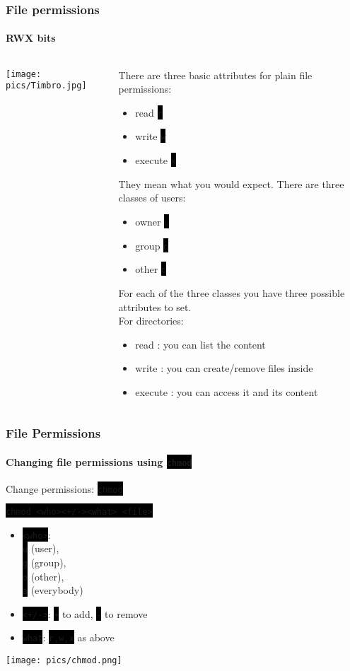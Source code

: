 \documentclass[unknownkeysallowed, 10pt, a4 paper, handout]{beamer}
\newcommand{\code}[1]{\colorbox{black}{\color{green}\texttt{#1}}}
\newcommand{\sidebyside}[5]{
  \begin{minipage}{#1\textwidth}
    #2
  \end{minipage} #3 \begin{minipage}{#4\textwidth}
    #5
  \end{minipage}
}
\begin{document}
\begin{frame}[label=permission]
  \frametitle{File permissions}
  \framesubtitle{RWX bits}
  \begin{columns}[T]
    \begin{column}{.11\textwidth}
      \texttt{[image: pics/Timbro.jpg]}
    \end{column}
    \hfill
    \begin{column}{.89\textwidth}
      \small{
      There are three basic attributes for plain file permissions:
      \begin{itemize}
        \item read \code{r}
        \item write \code{w}
        \item execute \code{x}
      \end{itemize}
      They mean what you would expect. There are three classes of users:
      \begin{itemize}
        \item owner \code{u}
        \item group \code{g}
        \item other \code{o}
      \end{itemize}
      For each of the three classes you have three possible attributes
      to set. \\
      \vspace{10pt}
      For directories:
      \begin{itemize}
         \item read : you can list the content
         \item write : you can create/remove files inside
         \item execute : you can access it and its content
      \end{itemize}
    }
    \end{column}
  \end{columns}
\end{frame}


\begin{frame}
  \frametitle{File Permissions}
  \framesubtitle{Changing file permissions using \code{chmod}}

  \sidebyside{0.42}{
    Change permissions: \code{chmod}

    \code{chmod <who><+/-><what> <file>}

    \begin{itemize}
      \item \code{<who>}:\\
        \code{u} (user),\\
        \code{g} (group),\\
        \code{o} (other),\\
        \code{a} (everybody)
      \item \code{<+/->}: \code{+} to add, \code{-} to remove
      \item \code{what}: \code{r,w,x} as above
    \end{itemize}
  }{\hfill}{0.48}{
  \begin{center}
    \texttt{[image: pics/chmod.png]}
  \end{center}
  }
\end{frame}
\end{document}

